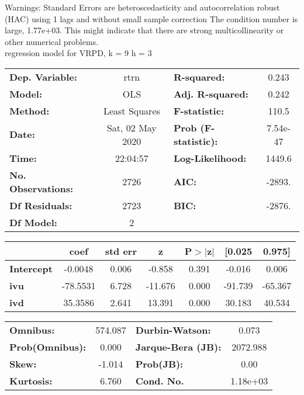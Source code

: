 Warnings: \newline
 [1] Standard Errors are heteroscedasticity and autocorrelation robust (HAC) using 1 lags and without small sample correction \newline
 [2] The condition number is large, 1.77e+03. This might indicate that there are \newline
 strong multicollinearity or other numerical problems.\\ 

regression model for VRPD, k = 9 h = 3\begin{center}
\begin{tabular}{lclc}
\toprule
\textbf{Dep. Variable:}    &       rtrn       & \textbf{  R-squared:         } &     0.243   \\
\textbf{Model:}            &       OLS        & \textbf{  Adj. R-squared:    } &     0.242   \\
\textbf{Method:}           &  Least Squares   & \textbf{  F-statistic:       } &     110.5   \\
\textbf{Date:}             & Sat, 02 May 2020 & \textbf{  Prob (F-statistic):} &  7.54e-47   \\
\textbf{Time:}             &     22:04:57     & \textbf{  Log-Likelihood:    } &    1449.6   \\
\textbf{No. Observations:} &        2726      & \textbf{  AIC:               } &    -2893.   \\
\textbf{Df Residuals:}     &        2723      & \textbf{  BIC:               } &    -2876.   \\
\textbf{Df Model:}         &           2      & \textbf{                     } &             \\
\bottomrule
\end{tabular}
\begin{tabular}{lcccccc}
                   & \textbf{coef} & \textbf{std err} & \textbf{z} & \textbf{P$> |$z$|$} & \textbf{[0.025} & \textbf{0.975]}  \\
\midrule
\textbf{Intercept} &      -0.0048  &        0.006     &    -0.858  &         0.391        &       -0.016    &        0.006     \\
\textbf{ivu}       &     -78.5531  &        6.728     &   -11.676  &         0.000        &      -91.739    &      -65.367     \\
\textbf{ivd}       &      35.3586  &        2.641     &    13.391  &         0.000        &       30.183    &       40.534     \\
\bottomrule
\end{tabular}
\begin{tabular}{lclc}
\textbf{Omnibus:}       & 574.087 & \textbf{  Durbin-Watson:     } &    0.073  \\
\textbf{Prob(Omnibus):} &   0.000 & \textbf{  Jarque-Bera (JB):  } & 2072.988  \\
\textbf{Skew:}          &  -1.014 & \textbf{  Prob(JB):          } &     0.00  \\
\textbf{Kurtosis:}      &   6.760 & \textbf{  Cond. No.          } & 1.18e+03  \\
\bottomrule
\end{tabular}
\end{center}

